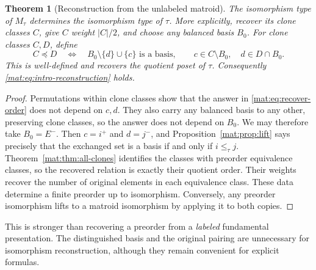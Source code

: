 \documentclass[11pt]{article}
\numberwithin{equation}{section}
\newtheorem{theorem}{Theorem}[section]
\theoremstyle{definition}
\begin{document}
\begin{theorem}[Reconstruction from the unlabeled matroid]\label{mat:thm:reconstruction}
The isomorphism type of $M_\tau$ determines the isomorphism type of $\tau$.
More explicitly, recover its clone classes $C$, give $C$ weight $|C|/2$,
and choose any balanced basis $B_0$. For clone classes $C,D$, define
\begin{equation}
 C\preceq D\quad\Longleftrightarrow\quad
 B_0\setminus\{d\}\cup\{c\}\text{ is a basis},
 \qquad c\in C\setminus B_0,\quad d\in D\cap B_0.
\label{mat:eq:recover-order}
\end{equation}
This is well-defined and recovers the quotient poset of $\tau$.
Consequently \eqref{mat:eq:intro-reconstruction} holds.
\end{theorem}
\begin{proof}
Permutations within clone classes show that the answer in
\eqref{mat:eq:recover-order} does not depend on $c,d$. They also carry any
balanced basis to any other, preserving clone classes, so the answer does
not depend on $B_0$. We may therefore take $B_0=E^-$. Then $c=i^+$ and
$d=j^-$, and Proposition~\ref{mat:prop:lift} says precisely that the exchanged
set is a basis if and only if $i\leq_\tau j$. Theorem~\ref{mat:thm:all-clones}
identifies the classes with preorder equivalence classes, so the recovered
relation is exactly their quotient order. Their weights recover the number
of original elements in each equivalence class. These data determine a
finite preorder up to isomorphism. Conversely, any preorder isomorphism
lifts to a matroid isomorphism by applying it to both copies.
\end{proof}

This is stronger than recovering a preorder from a \emph{labeled}
fundamental presentation. The distinguished basis and the original pairing
are unnecessary for isomorphism reconstruction, although they remain
convenient for explicit formulas.
\end{document}
